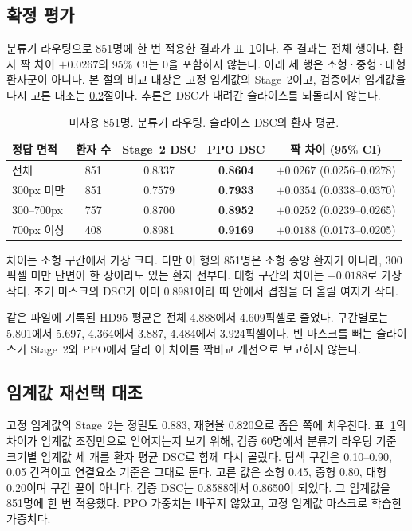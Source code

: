 \documentclass[runningheads]{llncs}
\begin{document}
\subsection{확정 평가}
\label{sec:locked}
분류기 라우팅으로 851명에 한 번 적용한 결과가 표~\ref{tab:locked}이다. 주 결과는 전체 행이다. 환자 짝 차이 $+0.0267$의 95\% CI는 0을 포함하지 않는다. 아래 세 행은 소형·중형·대형 환자군이 아니다. 본 절의 비교 대상은 고정 임계값의 Stage~2이고, 검증에서 임계값을 다시 고른 대조는 \ref{sec:retune}절이다. 추론은 DSC가 내려간 슬라이스를 되돌리지 않는다.

\begin{table}[t]
\caption{미사용 851명. 분류기 라우팅. 슬라이스 DSC의 환자 평균.}
\label{tab:locked}
\centering
\begin{tabular}{lcccc}
\toprule
정답 면적 & 환자 수 & Stage~2 DSC & PPO DSC & 짝 차이 (95\% CI) \\
\midrule
전체 & 851 & 0.8337 & \textbf{0.8604} & $+0.0267$ (0.0256--0.0278) \\
300px 미만 & 851 & 0.7579 & \textbf{0.7933} & $+0.0354$ (0.0338--0.0370) \\
300--700px & 757 & 0.8700 & \textbf{0.8952} & $+0.0252$ (0.0239--0.0265) \\
700px 이상 & 408 & 0.8981 & \textbf{0.9169} & $+0.0188$ (0.0173--0.0205) \\
\bottomrule
\end{tabular}
\end{table}

차이는 소형 구간에서 가장 크다. 다만 이 행의 851명은 소형 종양 환자가 아니라, 300픽셀 미만 단면이 한 장이라도 있는 환자 전부다. 대형 구간의 차이는 $+0.0188$로 가장 작다. 초기 마스크의 DSC가 이미 0.8981이라 띠 안에서 겹침을 더 올릴 여지가 작다.

같은 파일에 기록된 HD95 평균은 전체 4.888에서 4.609픽셀로 줄었다. 구간별로는 5.801에서 5.697, 4.364에서 3.887, 4.484에서 3.924픽셀이다. 빈 마스크를 빼는 슬라이스가 Stage~2와 PPO에서 달라 이 차이를 짝비교 개선으로 보고하지 않는다.

\subsection{임계값 재선택 대조}
\label{sec:retune}
고정 임계값의 Stage~2는 정밀도 0.883, 재현율 0.820으로 좁은 쪽에 치우친다. 표~\ref{tab:locked}의 차이가 임계값 조정만으로 얻어지는지 보기 위해, 검증 60명에서 분류기 라우팅 기준 크기별 임계값 세 개를 환자 평균 DSC로 함께 다시 골랐다. 탐색 구간은 0.10--0.90, 0.05 간격이고 연결요소 기준은 그대로 둔다. 고른 값은 소형 0.45, 중형 0.80, 대형 0.20이며 구간 끝이 아니다. 검증 DSC는 0.8588에서 0.8650이 되었다. 그 임계값을 851명에 한 번 적용했다. PPO 가중치는 바꾸지 않았고, 고정 임계값 마스크로 학습한 가중치다.
\end{document}
